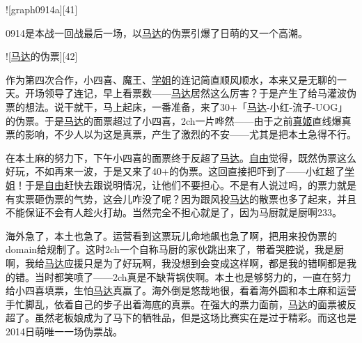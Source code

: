 
![graph0914a][41]

0914是本战一回战最后一场，以\uline{马达}的伪票引爆了日萌的又一个高潮。

![\uline{马达}的伪票][42]

作为第四次合作，小四喜、魔王、\uline{学姐}的连记简直顺风顺水，本来又是无聊的一天。开场领导了连记，早上看票数——\uline{马达}居然这么厉害？于是产生了给马灌波伪票的想法。说干就干，马上起床，一番准备，来了30+「\uline{马达}-小红-流子-UOG」的伪票。于是\uline{马达}的面票超过了小四喜，2ch一片哗然——由于之前\uline{真姬}直线爆真票的影响，不少人以为这是真票，产生了激烈的不安——尤其是把本土急得不行。

在本土麻的努力下，下午小四喜的面票终于反超了\uline{马达}。\uline{自由}觉得，既然伪票这么好玩，不如再来一波，于是又来了40+的伪票。这回直接把吓到了——小红超了\uline{学姐}！于是\uline{自由}赶快去跟说明情况，让他们不要担心。不是有人说过吗，的票力就是有实票砸伪票的气势，这会儿咋没了呢？因为跟风投\uline{马达}的散票也多了起来，并且不能保证不会有人趁火打劫。当然完全不担心就是了，因为马厨就是厨啊233。

海外急了，本土也急了。运营看到这票玩儿命地飙也急了啊，把用来投伪票的domain给规制了。这时2ch一个自称马厨的家伙跳出来了，带着哭腔说，我是厨啊，我给\uline{马达}应援只是为了好玩啊，我没想到会变成这样啊，都是我的错啊都是我的错。当时都笑喷了——2ch真是不缺背锅侠啊。本土也是够努力的，一直在努力给小四喜填票，生怕\uline{马达}真赢了。海外倒是悠哉地很，看着海外圆和本土麻和运营手忙脚乱，依着自己的步子出着海底的真票。在强大的票力面前，\uline{马达}的面票被反超了。虽然老板娘成为了马下的牺牲品，但是这场比赛实在是过于精彩。而这也是2014日萌唯一一场伪票战。

